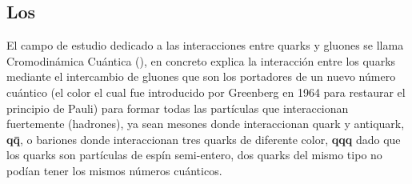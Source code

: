 \subsection*{Los \Quarks}

El campo de estudio dedicado a las interacciones entre quarks y gluones se llama Cromodinámica Cuántica (\QCD), en concreto explica la interacci\'on entre los quarks mediante el intercambio de gluones que son los portadores de un nuevo n\'umero cu\'antico (el color el cual fue introducido por Greenberg en 1964 para
restaurar el principio de Pauli) para formar todas las part\'iculas que interaccionan fuertemente (hadrones), ya sean mesones donde interaccionan quark y antiquark, \textbf{q\={q}}, o bariones
donde interaccionan tres quarks de diferente color, \textbf{qqq} dado que los quarks son part\'iculas de esp\'in semi-entero, dos quarks del mismo tipo no pod\'ian tener los mismos n\'umeros cu\'anticos. 

